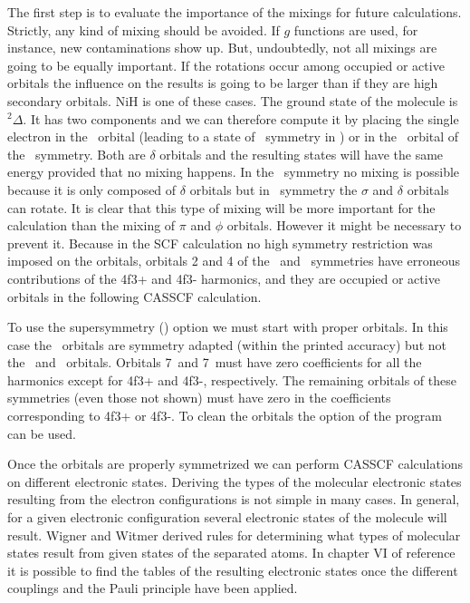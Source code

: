 The first step is to evaluate the importance of the mixings
for future calculations. Strictly, any kind of mixing should be avoided.
If $g$ functions are used, for instance, new contaminations show up. But,
undoubtedly, not all mixings are going to be equally important. If the 
rotations occur among occupied or active orbitals the influence
on the results is going to be larger than if they are high secondary
orbitals. NiH is one of these cases. The ground state of the molecule
is $^2\Delta$. It has two components and we can therefore compute it
by placing the single electron in the \dxy\ orbital (leading to a
state of \at\ symmetry in \Ctv) or in the \dxtyt\ orbital of the
\ao\ symmetry. Both are $\delta$ orbitals and the resulting states
will have the same energy provided that no mixing happens. In the
\at\ symmetry no mixing is possible because it is only composed
of $\delta$ orbitals but in \ao\ symmetry the $\sigma$ and $\delta$ orbitals
can rotate. It is clear that this type of mixing will be more
important for the calculation than the mixing of $\pi$ and $\phi$
orbitals. However it might be necessary to prevent it. Because in the
SCF calculation no high symmetry restriction was imposed on the orbitals, 
orbitals 2 and 4
of the \bo\ and \bt\ symmetries have erroneous contributions of
the 4f3+ and 4f3- harmonics, and they are occupied or active
orbitals in the following CASSCF calculation.


To use the supersymmetry () option we must
start with proper orbitals. In this case the \ao\ orbitals are
symmetry adapted (within the printed accuracy) but not the 
\bo\ and \bt\ orbitals. Orbitals 7\bo\ and 7\bt\
must have zero coefficients for all the harmonics except for
4f3+ and 4f3-, respectively. The remaining orbitals of these
symmetries (even those not shown) must have zero in the
coefficients corresponding to 4f3+ or 4f3-. To clean the orbitals
the option \keyword{CLEAnup} of the \program{RASSCF} program can be used.

Once the orbitals are properly symmetrized we can perform CASSCF
calculations on different electronic states. Deriving the types of the
molecular electronic states resulting from the electron configurations
is not simple in many cases. In general, for a given electronic
configuration several electronic states of the molecule will result.
Wigner and Witmer derived rules for determining what types of molecular 
states result from given states of the separated atoms. 
In chapter VI of reference \cite{Herzberg:66} it is possible to
find the tables of the resulting electronic states once the
different couplings and the Pauli principle have been applied.

